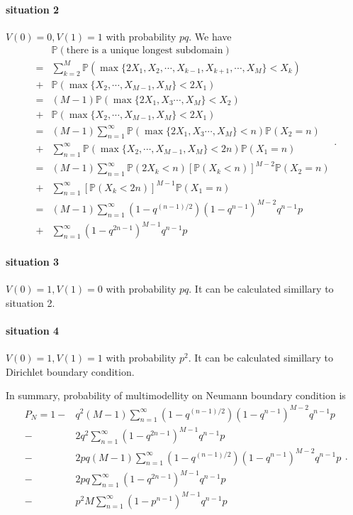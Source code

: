 \documentclass[a4paper,11pt]{article}
\begin{document}
\begin{appendices}
\paragraph*{situation 2}
$V(0) = 0, V(1) = 1$ with probability $p q$. We have
\begin{equation*}
\begin{split}
  & \mathbb{P}(\text{there is a unique longest subdomain}) \\
= & \sum_{k=2}^{M} \mathbb{P}(\max\{2 X_1, X_2, \cdots, X_{k-1}, X_{k+1}, \cdots, X_{M}\} < X_k) \\
+ & \mathbb{P}(\max\{X_2, \cdots, X_{M-1}, X_M\} < 2 X_1) \\
= & (M-1) \mathbb{P}(\max\{2 X_1, X_3 \cdots, X_{M}\} < X_2) \\
+ & \mathbb{P}(\max\{X_2, \cdots, X_{M-1}, X_M\} < 2 X_1) \\
= & (M-1) \sum_{n=1}^{\infty} \mathbb{P}(\max\{2 X_1, X_3 \cdots, X_{M}\} < n) \mathbb{P}(X_2 = n) \\
+ & \sum_{n=1}^{\infty} \mathbb{P}(\max\{X_2, \cdots, X_{M-1}, X_M\} < 2 n) \mathbb{P}(X_1 = n) \\
= & (M-1) \sum_{n=1}^{\infty} \mathbb{P}(2 X_k < n) [\mathbb{P}(X_k < n)]^{M-2} \mathbb{P}(X_2 = n) \\
+ & \sum_{n=1}^{\infty} [\mathbb{P}(X_k < 2 n)]^{M-1} \mathbb{P}(X_1 = n) \\
= & (M-1) \sum_{n=1}^{\infty} (1 - q^{(n-1)/2}) (1 - q^{n-1})^{M-2} q^{n-1} p \\
+ & \sum_{n=1}^{\infty} (1 - q^{2n-1})^{M-1} q^{n-1} p
\end{split}.
\end{equation*}

\paragraph*{situation 3}
$V(0) = 1, V(1) = 0$ with probability $p q$. It can be calculated simillary to situation 2.

\paragraph*{situation 4}
$V(0) = 1, V(1) = 1$ with probability $p^2$. It can be calculated simillary to Dirichlet boundary condition.

In summary, probability of multimodellity on Neumann boundary condition is
\begin{equation*}
\begin{split}
P_N = 1 - & q^2 (M-1) \sum_{n=1}^{\infty} (1 - q^{(n-1)/2}) (1 - q^{n-1})^{M-2} q^{n-1} p \\
- & 2 q^2 \sum_{n=1}^{\infty} (1 - q^{2n-1})^{M-1} q^{n-1} p \\
- & 2 p q (M-1) \sum_{n=1}^{\infty} (1 - q^{(n-1)/2}) (1 - q^{n-1})^{M-2} q^{n-1} p \\
- & 2 p q \sum_{n=1}^{\infty} (1 - q^{2n-1})^{M-1} q^{n-1} p \\
- & p^2 M \sum_{n=1}^{\infty} (1 - p^{n-1})^{M-1} q^{n-1} p
\end{split}.
\end{equation*}


\end{appendices}
\end{document}
